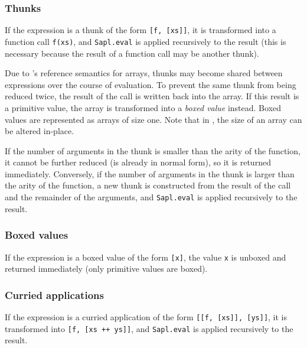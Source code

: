 \vspace{-0.5cm}\subsubsection{Thunks}
If the expression is a thunk of the form \texttt{[f, [xs]]}, it is transformed 
into a function call \texttt{f(xs)}, and \texttt{Sapl.eval} is applied 
recursively to the result (this is necessary because the result of a function 
call may be another thunk).

Due to \JS's reference semantics for arrays, thunks may become shared between 
expressions over the course of evaluation. To prevent the same thunk from being 
reduced twice, the result of the call is written back into the array. If this
result is a primitive value, the array is transformed into a \emph{boxed value}
instead. Boxed values are represented as arrays of size one. Note that in \JS,
the size of an array can be altered in-place.

If the number of arguments in the thunk is smaller than the arity of the 
function, it cannot be further reduced (is already in normal form), so it is
returned immediately. Conversely, if the number of arguments in the thunk is
larger than the arity of the function, a new thunk is constructed from the
result of the call and the remainder of the arguments, and \texttt{Sapl.eval}
is applied recursively to the result.

\vspace{-0.5cm}
\subsubsection{Boxed values}
If the expression is a boxed value of the form \texttt{[x]}, the value 
\texttt{x} is unboxed and returned immediately (only primitive values are boxed).

\vspace{-0.5cm}
\subsubsection{Curried applications}
If the expression is a curried application of the form
\texttt{[[f, [xs]], [ys]]}, it is transformed into  \texttt{[f, [xs ++ ys]]}, 
and \texttt{Sapl.eval} is applied recursively to the result.

